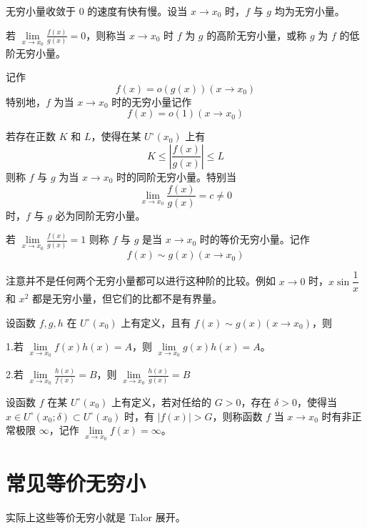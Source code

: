无穷小量收敛于 $0$ 的速度有快有慢。设当 $x \to x_0$ 时，$f$ 与 $g$ 均为无穷小量。

若 $\lim\limits_{x \to x_0}\frac{f(x)}{g(x)} = 0$，则称当 $x \to x_0$ 时 $f$ 为 $g$ 的高阶无穷小量，或称 $g$ 为 $f$ 的低阶无穷小量。

记作
\[ f(x)=o(g(x))(x \to x_0) \]
特别地，$f$ 为当 $x \to x_0$ 时的无穷小量记作
\[ f(x)=o(1)(x \to x_0) \]

若存在正数 $K$ 和 $L$，使得在某 $U^\circ(x_0)$ 上有
\[ K\leqslant \left|\frac{f(x)}{g(x)}\right| \leqslant L \]
则称 $f$ 与 $g$ 为当 $x \to x_0$ 时的同阶无穷小量。特别当
\[ \lim_{x \to x_0}\frac{f(x)}{g(x)} = c \ne 0 \]
时，$f$ 与 $g$ 必为同阶无穷小量。

若 $\lim\limits_{x \to x_0}\frac{f(x)}{g(x)} = 1$ 则称 $f$ 与 $g$ 是当 $x \to x_0$ 时的等价无穷小量。记作
\[ f(x) \sim g(x) (x \to x_0) \]

注意并不是任何两个无穷小量都可以进行这种阶的比较。例如 $x \to 0$ 时，$x\sin\dfrac{1}{x}$ 和 $x^2$ 都是无穷小量，但它们的比都不是有界量。

\begin{theorem}
	设函数 $f,g,h$ 在 $U^\circ(x_0)$ 上有定义，且有 $f(x) \sim g(x)(x \to x_0)$，则

	1.若 $\lim\limits_{x \to x_0}f(x)h(x) = A$，则 $\lim\limits_{x \to x_0}g(x)h(x) = A$。

	2.若 $\lim\limits_{x \to x_0}\frac{h(x)}{f(x)}=B$，则 $\lim\limits_{x \to x_0}\frac{h(x)}{g(x)}=B$
\end{theorem}

\begin{definition}[无穷大量]
	设函数 $f$ 在某 $U^\circ(x_0)$ 上有定义，若对任给的 $G>0$，存在 $\delta>0$，使得当 $x\in U^\circ(x_0;\delta)\subset U^\circ(x_0)$ 时，有 $|f(x)|>G$，则称函数 $f$ 当 $x \to x_0$ 时有非正常极限 $\infty$，记作 $\lim\limits_{x \to x_0}f(x) = \infty$。
\end{definition}

\section{常见等价无穷小}

实际上这些等价无穷小就是 Talor 展开。

